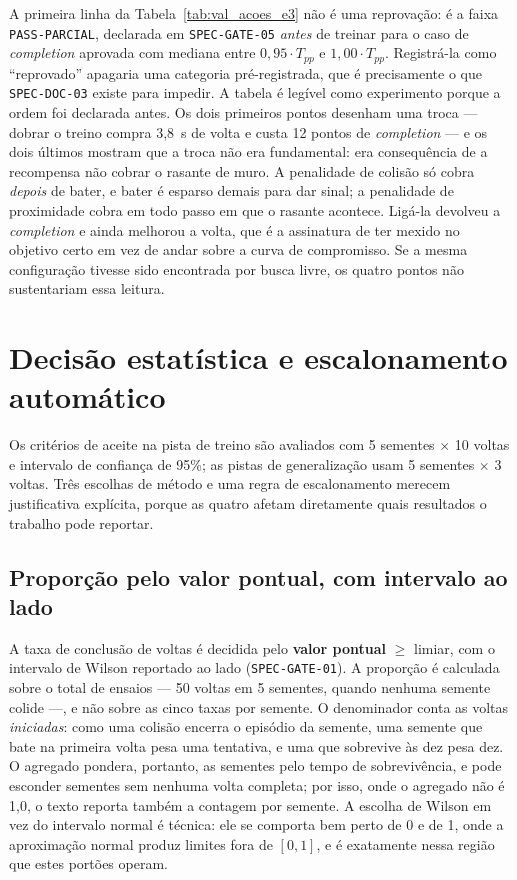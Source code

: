 A primeira linha da Tabela~\ref{tab:val_acoes_e3} não é uma reprovação: é a
faixa \texttt{PASS-PARCIAL}, declarada em \texttt{SPEC-GATE-05} \textit{antes}
de treinar para o caso de \textit{completion} aprovada com mediana entre
$0{,}95 \cdot T_{pp}$ e $1{,}00 \cdot T_{pp}$. Registrá-la como ``reprovado''
apagaria uma categoria pré-registrada, que é precisamente o que
\texttt{SPEC-DOC-03} existe para impedir. A tabela é legível como experimento
porque a ordem foi declarada antes. Os dois primeiros pontos desenham uma troca --- dobrar o treino
compra 3,8~s de volta e custa 12 pontos de \textit{completion} --- e os dois
últimos mostram que a troca não era fundamental: era consequência de a recompensa
não cobrar o rasante de muro. A penalidade de colisão só cobra \textit{depois} de
bater, e bater é esparso demais para dar sinal; a penalidade de proximidade cobra
em todo passo em que o rasante acontece. Ligá-la devolveu a \textit{completion} e
ainda melhorou a volta, que é a assinatura de ter mexido no objetivo certo em vez
de andar sobre a curva de compromisso. Se a mesma configuração tivesse sido
encontrada por busca livre, os quatro pontos não sustentariam essa leitura.

\section{Decisão estatística e escalonamento automático}\label{sec:val-estatistica}

Os critérios de aceite na pista de treino são avaliados com 5 sementes
$\times$ 10 voltas e intervalo de confiança de 95\%; as pistas de generalização
usam 5 sementes $\times$ 3 voltas. Três escolhas de método e uma regra de
escalonamento merecem justificativa explícita, porque as quatro afetam diretamente
quais resultados o trabalho pode reportar.

\subsection{Proporção pelo valor pontual, com intervalo ao lado}

A taxa de conclusão de voltas é decidida pelo \textbf{valor pontual}
$\geq$ limiar, com o intervalo de Wilson reportado ao lado
(\texttt{SPEC-GATE-01}). A proporção é calculada sobre o total de ensaios ---
50 voltas em 5 sementes, quando nenhuma semente colide ---, e não sobre as cinco
taxas por semente. O denominador conta as voltas \textit{iniciadas}: como uma
colisão encerra o episódio da semente, uma semente que bate na primeira volta
pesa uma tentativa, e uma que sobrevive às dez pesa dez. O agregado pondera,
portanto, as sementes pelo tempo de sobrevivência, e pode esconder sementes sem
nenhuma volta completa; por isso, onde o agregado não é 1,0, o texto reporta
também a contagem por semente. A escolha de
Wilson em vez do intervalo normal é técnica: ele se comporta bem perto de 0 e de
1, onde a aproximação normal produz limites fora de $[0,1]$, e é exatamente nessa
região que estes portões operam.

